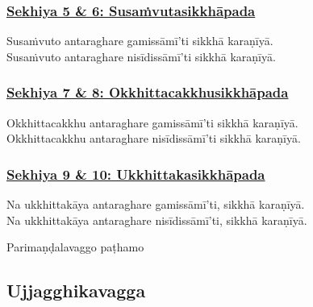 \subsubsection*{\hyperref[training5-6]{Sekhiya 5 \& 6: Susaṁvutasikkhāpada}}
\label{sekh5-6}

Susaṁvuto antaraghare gamissāmī'ti sikkhā karaṇīyā.\\
Susaṁvuto antaraghare nisīdissāmī'ti sikkhā karaṇīyā.



\subsubsection*{\hyperref[training7-8]{Sekhiya 7 \& 8: Okkhittacakkhusikkhāpada}}
\label{sekh7-8}

Okkhittacakkhu antaraghare gamissāmī'ti sikkhā karaṇīyā.\\
Okkhittacakkhu antaraghare nisīdissāmī'ti sikkhā karaṇīyā.



\subsubsection*{\hyperref[training9-10]{Sekhiya 9 \& 10: Ukkhittakasikkhāpada}}
\label{sekh9-10}

Na ukkhittakāya\makeatletter\hyperlink{endnote473-appendix}\makeatother{} antaraghare gamissāmī'ti, sikkhā karaṇīyā.\\
Na ukkhittakāya antaraghare nisīdissāmī'ti, sikkhā karaṇīyā.

\begin{center}
	Parimaṇḍalavaggo paṭhamo\makeatletter\hyperlink{endnote474-appendix}\makeatother{}
\end{center}



\subsection{Ujjagghikavagga}
\label{sekh-vagga2}


